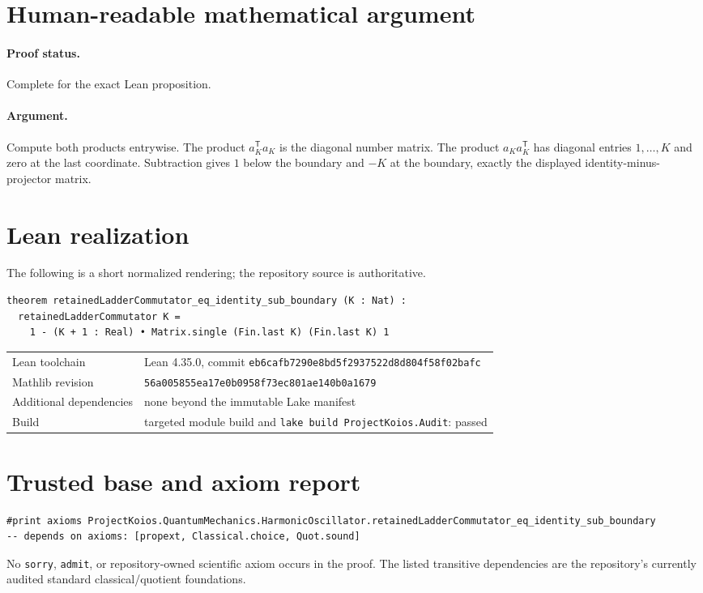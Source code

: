 \documentclass[11pt]{article}
\begin{document}
\section{Human-readable mathematical argument}
\paragraph{Proof status.} Complete for the exact Lean proposition.
\paragraph{Argument.} Compute both products entrywise.  The product $a_K^{\mathsf T}a_K$ is the diagonal number matrix.  The product $a_Ka_K^{\mathsf T}$ has diagonal entries $1,\ldots,K$ and zero at the last coordinate.  Subtraction gives $1$ below the boundary and $-K$ at the boundary, exactly the displayed identity-minus-projector matrix.

\section{Lean realization}
The following is a short normalized rendering; the repository source is authoritative.
\begin{lstlisting}
theorem retainedLadderCommutator_eq_identity_sub_boundary (K : Nat) :
  retainedLadderCommutator K =
    1 - (K + 1 : Real) • Matrix.single (Fin.last K) (Fin.last K) 1
\end{lstlisting}
\begin{tabularx}{\textwidth}{@{}lY@{}}\toprule
Lean toolchain & Lean 4.35.0, commit \texttt{eb6cafb7290e8bd5f2937522d8d804f58f02bafc} \\
Mathlib revision & \texttt{56a005855ea17e0b0958f73ec801ae140b0a1679} \\
Additional dependencies & none beyond the immutable Lake manifest \\
Build & targeted module build and \texttt{lake build ProjectKoios.Audit}: passed \\
\bottomrule\end{tabularx}

\section{Trusted base and axiom report}
\begin{lstlisting}
#print axioms ProjectKoios.QuantumMechanics.HarmonicOscillator.retainedLadderCommutator_eq_identity_sub_boundary
-- depends on axioms: [propext, Classical.choice, Quot.sound]
\end{lstlisting}
No \texttt{sorry}, \texttt{admit}, or repository-owned scientific axiom occurs in the
proof. The listed transitive dependencies are the repository's currently audited standard
classical/quotient foundations.
\end{document}

